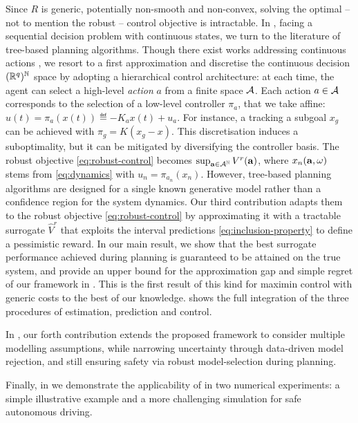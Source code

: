 \documentclass{article}
\begin{document}
Since $R$ is generic, potentially non-smooth and non-convex, solving the optimal -- not to mention the robust -- control objective is intractable. In , facing a sequential decision problem with continuous states, we turn to the literature of tree-based planning algorithms. Though there exist works addressing continuous actions \citep{Busoniu2018,Weinstein2012}, we resort to a first approximation and discretise the continuous decision $(\mathbb{R}^q)^{\mathbb{N}}$ space by adopting a hierarchical control architecture: at each time, the agent can select a high-level \emph{action} $a$ from a finite space $\mathcal{A}$. Each action $a\in\mathcal{A}$ corresponds to the selection of a low-level controller $\pi_a$, that we take affine: $u(t) = \pi_a(x(t)) \eqdef -K_a x(t) + u_a.$ For instance, a tracking a subgoal $x_g$ can be achieved with $\pi_g = K(x_g - x)$. This discretisation induces a suboptimality, but it can be mitigated by diversifying the controller basis.
The robust objective \eqref{eq:robust-control} becomes $\sup_{\mathbf{a}\in{\mathcal{A}}^{\mathbb{N}}} V^r(\mathbf{a})$, where $x_n(\mathbf{a}, \omega)$ stems from \eqref{eq:dynamics} with $u_n = \pi_{a_n}(x_n)$.
However, tree-based planning algorithms are designed for a single known generative model rather than a confidence region for the system dynamics. Our third contribution adapts them to the robust objective \eqref{eq:robust-control} by approximating it with a tractable surrogate $\hat{V}^r$ that exploits the interval predictions \eqref{eq:inclusion-property} to define a pessimistic reward. In our main result, we show that the best surrogate performance achieved during planning is guaranteed to be attained on the true system, and provide an upper bound for the approximation gap and simple regret of our framework in . This is the first result of this kind for maximin control with generic costs to the best of our knowledge.  shows the full integration of the three procedures of estimation, prediction and control. 

In , our forth contribution extends the proposed framework to consider multiple modelling assumptions, while narrowing uncertainty through data-driven model rejection, and still ensuring safety via robust model-selection during planning.

Finally, in  we demonstrate the applicability of  in two numerical experiments: a simple illustrative example and a more challenging simulation for safe autonomous driving.
\end{document}
